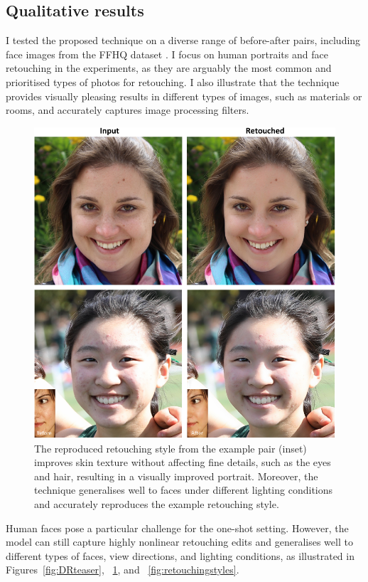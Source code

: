 \subsection{Qualitative results}
 I tested the proposed technique on a diverse range of before-after pairs, including face images from the FFHQ dataset \cite{karras2019style}. I focus on human portraits and face retouching in the experiments, as they are arguably the most common and prioritised types of photos for retouching. I also illustrate that the technique provides visually pleasing results in different types of images, such as materials or rooms, and accurately captures image processing filters.
 
\begin{figure}[th] %
    \centering
	\includegraphics[width=0.8\columnwidth]{Chapters/detail-retouching-figs/res_diff_light_2_cvmp.pdf}
    \caption{\label{fig:newdataset_ex}The reproduced retouching style from the example pair (inset) improves skin texture without affecting fine details, such as the eyes and hair, resulting in a visually improved portrait. Moreover, the technique generalises well to faces under different lighting conditions and accurately reproduces the example retouching style.}
 
\end{figure}
Human faces pose a particular challenge for the one-shot setting. However, the model can still capture highly nonlinear retouching edits and generalises well to different types of faces, view directions, and lighting conditions, as illustrated in Figures~\ref{fig:DRteaser}, ~\ref{fig:newdataset_ex}, and ~\ref{fig:retouchingstyles}.


